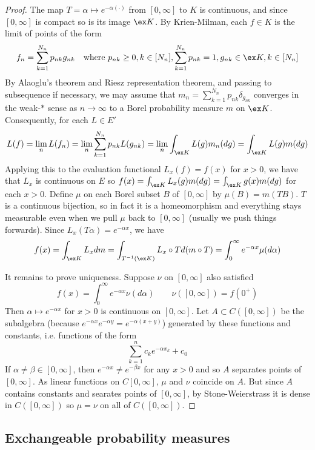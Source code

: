 \begin{proof}
  The map $T = \alpha \mapsto e^{-\alpha(\cdot)}$ from $[0, \infty]$ to $K$
  is continuous, and since $[0, \infty]$ is compact so is its image $\ex K$.
  By Krien-Milman, each $f \in K$ is the limit of points of the form
  \[
    f_n = \sum_{k=1}^{N_n} p_{nk} g_{nk}
    \quad\text{where}~p_{nk} \geq 0, k \in [N_n],
    \sum_{k=1}^{N_n} p_{nk} = 1, g_{nk} \in \ex K, k \in [N_n]
  \]
  By Alaoglu's theorem and Riesz representation theorem, and
  passing to subsequence if necessary, we may assume that
  $m_n = \sum_{k=1}^{N_n} p_{nk} \delta_{g_{nk}}$ converges in the
  weak-$\ast$ sense as $n \to \infty$ to a Borel probability
  measure $m$ on $\ex K$. Consequently, for each $L \in E'$
  \[
    L(f) = \lim_{n} L(f_n) = \lim_n \sum_{k=1}^{N_n} p_{nk} L(g_{nk})
    = \lim_n \int_{\ex K} L(g) m_n(dg)
    = \int_{\ex K} L(g) m(dg)
  \]
  Applying this to the evaluation functional $L_x(f) = f(x)$ for $x > 0$,
  we have that $L_x$ is continuous on $E$ so $f(x) = \int_{\ex K} L_x(g) m(dg)
  = \int_{\ex K} g(x) m(dg)$ for each $x > 0$.
  Define $\mu$ on each Borel subset $B$ of $[0,\infty]$ by $\mu(B) = m(TB)$.
  $T$ is a continuous bijection, so in fact it is a homeomorphism
  and everything stays measurable even when we pull $\mu$ back
  to $[0,\infty]$ (usually we push things forwards).
  Since $L_x(T\alpha) = e^{-\alpha x}$, we have
  \[
    f(x)
    = \int_{\ex K} L_x dm
    = \int_{T^{-1}(\ex K)} L_x \circ T d(m \circ T)
    = \int_0^\infty e^{-\alpha x} \mu(d\alpha)
  \]

  It remains to prove uniqueness. Suppose $\nu$ on $[0,\infty]$
  also satisfied
  \[
    f(x) = \int_0^\infty  e^{-\alpha x} \nu(d\alpha) \qquad \nu([0,\infty]) = f(0^+)
  \]
  Then $\alpha \mapsto e^{-\alpha x}$ for $x > 0$ is continuous on $[0,\infty]$.
  Let $A \subset C([0,\infty])$ be the subalgebra
  (because $e^{-\alpha x} e^{-\alpha y} = e^{-\alpha (x + y)}$)
  generated by these functions
  and constants, i.e. functions of the form
  \[
    \sum_{k=1}^n c_k e^{-\alpha x_k} + c_0
  \]
  If $\alpha \neq \beta \in [0, \infty]$, then
  $e^{-\alpha x} \neq e^{-\beta x}$ for any $x > 0$ and so $A$ separates points
  of $[0, \infty]$. As linear functions on $C[0,\infty]$,
  $\mu$ and $\nu$ coincide on $A$.
  But since $A$ contains constants and searates points of $[0,\infty]$,
  by Stone-Weierstrass it is dense in $C([0,\infty])$ so $\mu = \nu$
  on all of $C([0,\infty])$.
\end{proof}

\subsection{Exchangeable probability measures}

